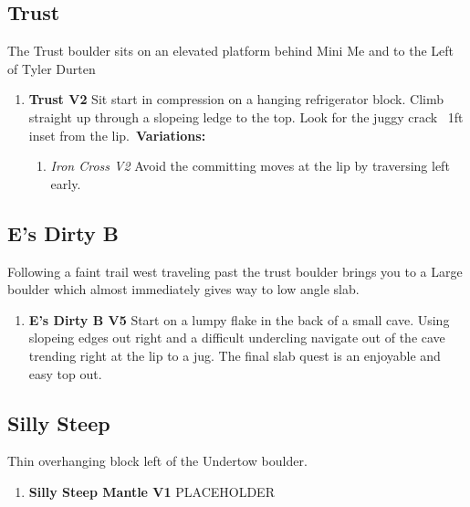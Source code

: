 \subsection*{Trust}\label{bf:Trust}
The Trust boulder sits on an elevated platform behind Mini Me and to the Left of Tyler Durten

\begin{enumerate}[resume]
	\item\label{rt:Trust} \colorbox{green!20}{\textbf{Trust V2     } }
	\newline Sit start in compression on a hanging refrigerator block. Climb straight up through a slopeing ledge to the top. Look for the juggy crack ~1ft inset from the lip.\
	\newline \textbf{Variations:}
	\begin{enumerate}
		\item\label{vr:Iron Cross} \colorbox{green!20}{\emph{Iron Cross V2   }  }
		\newline Avoid the committing moves at the lip by traversing left early.\
	\end{enumerate}
\end{enumerate}
\subsection*{E's Dirty B}\label{bf:E's Dirty B}
Following a faint trail west traveling past the trust boulder brings you to a Large boulder which almost immediately gives way to low angle slab.

\begin{enumerate}[resume]
	\item\label{rt:E's Dirty B} \colorbox{RoyalBlue!20}{\textbf{E's Dirty B V5    } }
	\newline Start on a lumpy flake in the back of a small cave. Using slopeing edges out right and a difficult undercling navigate out of the cave trending right at the lip to a jug. The final slab quest is an enjoyable and easy top out.\
\end{enumerate}
\subsection*{Silly Steep}\label{bf:Silly Steep}
Thin overhanging block left of the Undertow boulder.

\begin{enumerate}[resume]
	\item\label{rt:Silly Steep Mantle} \colorbox{green!20}{\textbf{Silly Steep Mantle V1  } }
	\newline PLACEHOLDER\
\end{enumerate}
